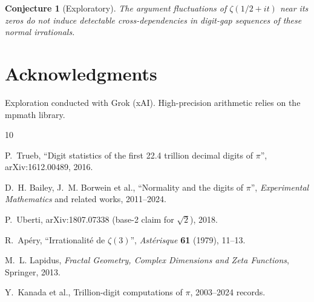 \documentclass[11pt]{amsart}
\theoremstyle{plain}
\newtheorem{conjecture}[theorem]{Conjecture}
\theoremstyle{definition}
\begin{document}
\begin{conjecture}[Exploratory]
The argument fluctuations of $\zeta(1/2+it)$ near its zeros do not induce detectable cross-dependencies in digit-gap sequences of these normal irrationals.
\end{conjecture}

\section{Acknowledgments}
Exploration conducted with Grok (xAI). High-precision arithmetic relies on the mpmath library.


\begin{thebibliography}{10}

P.~Trueb,
``Digit statistics of the first 22.4 trillion decimal digits of $\pi$'',
arXiv:1612.00489, 2016.

D.~H. Bailey, J.~M. Borwein et al.,
``Normality and the digits of $\pi$'',
\emph{Experimental Mathematics} and related works, 2011--2024.

P.~Uberti,
arXiv:1807.07338 (base-2 claim for $\sqrt{2}$), 2018.

R.~Apéry,
``Irrationalité de $\zeta(3)$'',
\emph{Astérisque} \textbf{61} (1979), 11--13.

M.~L. Lapidus,
\emph{Fractal Geometry, Complex Dimensions and Zeta Functions},
Springer, 2013.

Y.~Kanada et al.,
Trillion-digit computations of $\pi$, 2003--2024 records.

\end{thebibliography}
\end{document}
